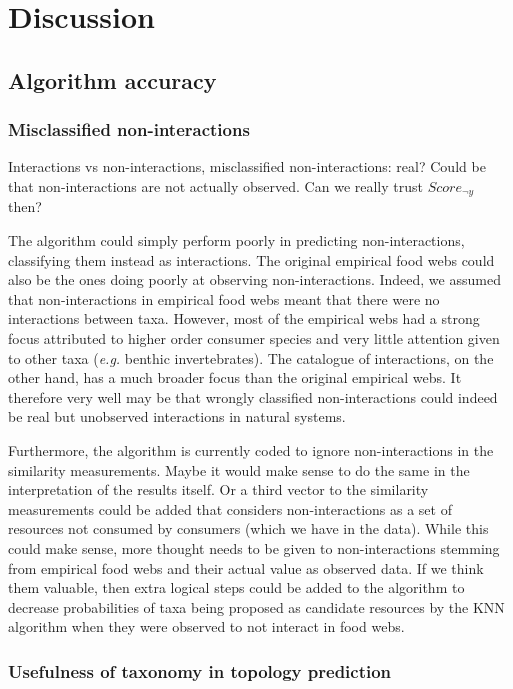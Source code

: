 \documentclass[letterpaper]{article}
\begin{document}
\section{Discussion}

\subsection{Algorithm accuracy}
\subsubsection{Misclassified non-interactions}
Interactions vs non-interactions, misclassified non-interactions: real? Could be that non-interactions are not actually observed. Can we really trust $Score_{\neg y}$ then?

The algorithm could simply perform poorly in predicting non-interactions, classifying them instead as interactions. The original empirical food webs could also be the ones doing poorly at observing non-interactions. Indeed, we assumed that non-interactions in empirical food webs meant that there were no interactions between taxa. However, most of the empirical webs had a strong focus attributed to higher order consumer species and very little attention given to other taxa (\textit{e.g.} benthic invertebrates). The catalogue of interactions, on the other hand, has a much broader focus than the original empirical webs. It therefore very well may be that wrongly classified non-interactions could indeed be real but unobserved interactions in natural systems.

Furthermore, the algorithm is currently coded to ignore non-interactions in the similarity measurements. Maybe it would make sense to do the same in the interpretation of the results itself. Or a third vector to the similarity measurements could be added that considers non-interactions as a set of resources not consumed by consumers (which we have in the data). While this could make sense, more thought needs to be given to non-interactions stemming from empirical food webs and their actual value as observed data. If we think them valuable, then extra logical steps could be added to the algorithm to decrease probabilities of taxa being proposed as candidate resources by the KNN algorithm when they were observed to not interact in food webs.

\subsubsection{Usefulness of taxonomy in topology prediction}
\end{document}

